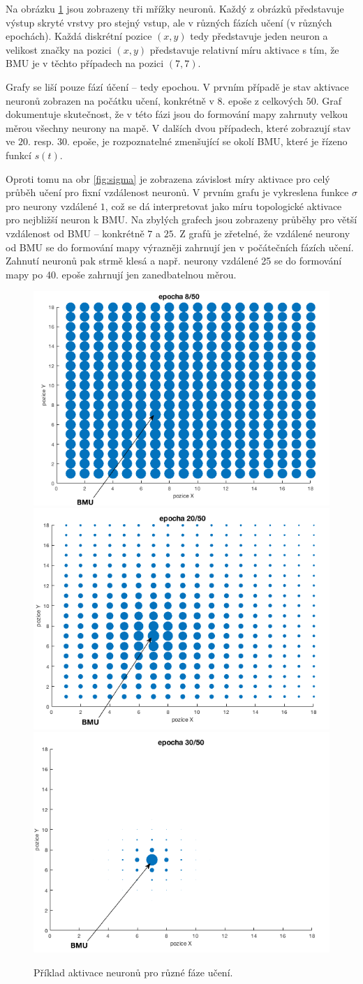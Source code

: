 \documentclass[thesis=M,czech]{FITthesis}[2012/06/26]
\begin{document}
Na obrázku \ref{fig:top_restr} jsou zobrazeny tři mřížky neuronů. Každý z obrázků představuje výstup skryté vrstvy pro stejný vstup, ale v různých fázích učení (v různých epochách). Každá diskrétní pozice $(x, y)$ tedy představuje jeden neuron a velikost značky na pozici $(x, y)$ představuje relativní míru aktivace s tím, že BMU je v těchto případech na pozici  $(7, 7)$.

Grafy se liší pouze fází účení -- tedy epochou. V prvním případě je stav aktivace neuronů zobrazen na počátku učení, konkrétně v $8.$ epoše z celkových $50$. Graf dokumentuje skutečnost, že v této fázi jsou do formování mapy zahrnuty velkou měrou všechny neurony na mapě. V dalších dvou případech, které zobrazují stav ve $20.$ resp. $30.$ epoše, je rozpoznatelné zmenšující se okolí BMU, které je řízeno funkcí $s(t)$.


Oproti tomu na obr \ref{fig:sigma} je zobrazena závislost míry aktivace pro celý průběh učení pro fixní vzdálenost neuronů. V prvním grafu je vykreslena funkce $\sigma$ pro neurony vzdálené $1$, což se dá interpretovat jako míru topologické aktivace pro nejbližší neuron k BMU.
Na zbylých grafech jsou zobrazeny průběhy pro větší vzdálenost od BMU -- konkrétně $7$ a $25$. Z grafů je zřetelné, že vzdálené neurony od BMU se do formování mapy výrazněji zahrnují jen v počátečních fázích učení. Zahnutí neuronů pak strmě klesá a např. neurony vzdálené 25 se do formování mapy po 40. epoše zahrnují jen zanedbatelnou měrou.

\begin{figure}[htp]

\centering
\hspace*{-1cm}
\includegraphics[width=.33\textwidth]{top_restr_8.png}
\includegraphics[width=.33\textwidth]{top_restr_20.png}
\includegraphics[width=.33\textwidth]{top_restr_30.png}
\hspace*{-1cm}
\caption{Příklad aktivace neuronů pro různé fáze učení.}
\label{fig:top_restr}

\end{figure}
\end{document}
